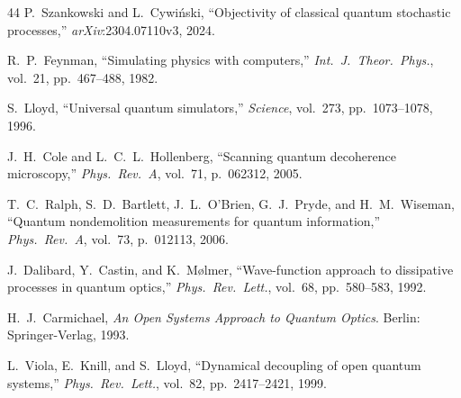 \documentclass[journal,twocolumn]{IEEEtran}
\theoremstyle{definition}
\theoremstyle{plain}
\begin{document}
\begin{thebibliography}{44}
P.~Szankowski and L.~Cywi\'{n}ski, ``Objectivity of classical
quantum stochastic processes,'' \emph{arXiv}:2304.07110v3, 2024.

R.~P.~Feynman, ``Simulating physics with computers,''
\emph{Int.\ J.\ Theor.\ Phys.}, vol.~21, pp.~467--488, 1982.

S.~Lloyd, ``Universal quantum simulators,'' \emph{Science},
vol.~273, pp.~1073--1078, 1996.

J.~H.~Cole and L.~C.~L.~Hollenberg, ``Scanning quantum decoherence
microscopy,'' \emph{Phys.\ Rev.\ A}, vol.~71, p.~062312, 2005.

T.~C.~Ralph, S.~D.~Bartlett, J.~L.~O'Brien, G.~J.~Pryde, and
H.~M.~Wiseman, ``Quantum nondemolition measurements for quantum
information,'' \emph{Phys.\ Rev.\ A}, vol.~73, p.~012113, 2006.

J.~Dalibard, Y.~Castin, and K.~M{\o}lmer, ``Wave-function approach
to dissipative processes in quantum optics,'' \emph{Phys.\ Rev.\
Lett.}, vol.~68, pp.~580--583, 1992.

H.~J.~Carmichael, \emph{An Open Systems Approach to Quantum
Optics}. Berlin: Springer-Verlag, 1993.

L.~Viola, E.~Knill, and S.~Lloyd, ``Dynamical decoupling of open
quantum systems,'' \emph{Phys.\ Rev.\ Lett.}, vol.~82,
pp.~2417--2421, 1999.

\end{thebibliography}
\end{document}
